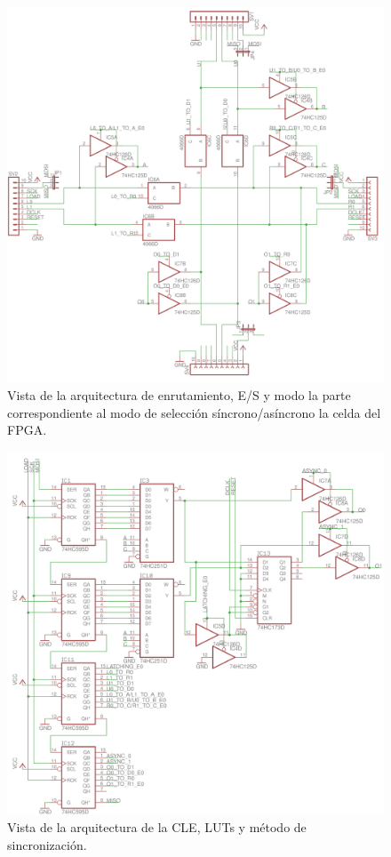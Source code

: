 \documentclass[12pt]{article}
\begin{document}
\begin{figure}[H]
  \centering
  \includegraphics[width=\textwidth]{5-input-output-routing.png}
  \caption{Vista de la arquitectura de enrutamiento, E/S y modo la parte correspondiente al modo de selección síncrono/asíncrono la celda del FPGA.}
  \label{fig:7}
\end{figure}

\begin{figure}[H]
  \centering
  \includegraphics[width=\textwidth]{6-clb-lut.png}
  \caption{Vista de la arquitectura de la CLE, LUTs y método de sincronización.}
  \label{fig:8}
\end{figure}
\end{document}
